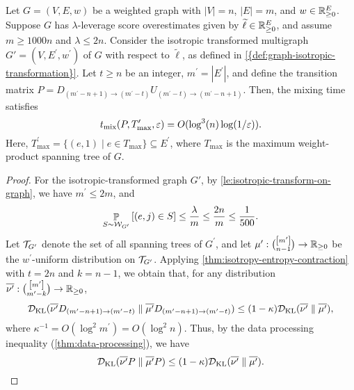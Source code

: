 \documentclass[11pt]{article}
\newcommand{\abss}[1]{\left\lvert #1 \right\rvert}
\newcommand{\parens}[1]{( #1 )}
\newcommand{\sqb}[1]{\left[ #1 \right]}
\newcommand{\sets}[1]{\{ #1 \}}
\begin{document}
{\begin{proposition}\label{prop:isotropic-graph-mixing-time}
  Let $G = (V, E, w)$  be a weighted graph with $\abss{V} = n$, $\abss{E} = m$, and $w \in \mathbb{R}^E_{\geq 0}$. Suppose $G$ has $\lambda$-leverage score overestimates given by $\widetilde \ell\in \mathbb{R}_{\geq 0}^E$, and assume $m \ge 1000 n$ and $\lambda\leq 2n$. Consider the isotropic transformed multigraph  $G'=\parens{V,E^\prime, w^\prime}$  of $G$ with respect to $\widetilde \ell$, as defined in \cref{{def:graph-isotropic-transformation}}.
    Let $t \ge n$ be an integer, $m^\prime=\abss{E^\prime}$, and define the transition matrix
    $P = D _{\parens{m^{\prime}-n+1}\to \parens{m^{\prime}-t}} U_{\parens{m^{\prime}-t}\to \parens{m^\prime-n+1}}$.
    Then, the mixing time satisfies
    \begin{equation}\label{eq:MT}
t_{\mix}\parens{P,T_{\max}^\prime,\varepsilon} = O(\log^3(n) \log(1/\varepsilon)).
    \end{equation}
Here, $T_{\max}^\prime=\sets{\parens{e,1}\mid e\in T_{\max}}\subseteq E^\prime$, where $T_{\max}$ is the maximum weight-product spanning tree of $G$. 
\end{proposition}
\begin{proof}
    For the isotropic-transformed graph $G'$,
    by \cref{le:isotropic-transform-on-graph},
    we have $m ^\prime \leq 2m$, and
    \begin{equation*}
    \pb_{S \sim \cW_{G ^\prime}}\sqb{(e, j)\in S} \le \frac{\lambda}{m} \le \frac{2n}{m} \leq  \frac{1}{500}.
    \end{equation*}
    Let $\mathcal{T}_{G^\prime}$ denote the set of all spanning trees of $G^\prime$, and let $\mu^\prime:\binom{\sqb{m^\prime}}{n-1}\to \RR_{\geq 0}$ be the $w^\prime$-uniform distribution on $\mathcal{T}_{G^\prime}$. Applying \cref{thm:isotropy-entropy-contraction}
    with $t = 2n$ and $k = n-1$,
    we obtain that, for any distribution $\bar{\nu^\prime}:\binom{\sqb{m^\prime}}{m ^\prime -k}\to \RR_{\geq 0}$,
    \begin{equation*}
	\cD_{\KL}\parens{\bar{\nu^\prime}D _{\parens{m^\prime-n+1}\to \parens{m^\prime-t}}\parallel \bar{\mu^\prime} D_{\parens{m^\prime-n+1}\to \parens{m^\prime-t}}}\leq \parens{1-\kappa} \cD_{\KL}\parens{\bar {\nu^\prime}\parallel \bar {\mu^\prime}},
   \end{equation*}
    where $\kappa^{-1} = O(\log^2 m^\prime) = O(\log^2 n)$.
    Thus, by
    the data processing inequality (\cref{thm:data-processing}),
    we have
\[
	\cD_{\KL}\parens{\bar {\nu^\prime} P \parallel \bar{\mu^\prime} P }\leq \parens{1-\kappa} \cD_{\KL}\parens{\bar {\nu^\prime}\parallel \bar {\mu^\prime}}.
\]
\end{proof}}
\end{document}
